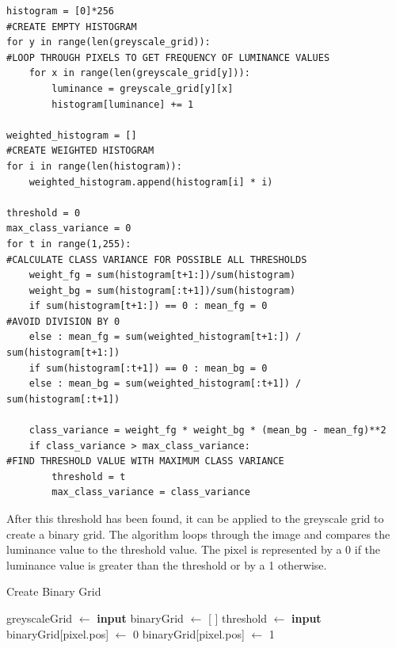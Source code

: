 \documentclass[titlepage]{article}
\begin{document}
\begin{changemargin}{-1in}{-1in} 
\begin{verbatim}
histogram = [0]*256                                                             #CREATE EMPTY HISTOGRAM
for y in range(len(greyscale_grid)):                                            #LOOP THROUGH PIXELS TO GET FREQUENCY OF LUMINANCE VALUES
    for x in range(len(greyscale_grid[y])):
        luminance = greyscale_grid[y][x]
        histogram[luminance] += 1

weighted_histogram = []                                                         #CREATE WEIGHTED HISTOGRAM
for i in range(len(histogram)):
    weighted_histogram.append(histogram[i] * i)

threshold = 0
max_class_variance = 0
for t in range(1,255):                                                          #CALCULATE CLASS VARIANCE FOR POSSIBLE ALL THRESHOLDS
    weight_fg = sum(histogram[t+1:])/sum(histogram)
    weight_bg = sum(histogram[:t+1])/sum(histogram)
    if sum(histogram[t+1:]) == 0 : mean_fg = 0                                  #AVOID DIVISION BY 0                             
    else : mean_fg = sum(weighted_histogram[t+1:]) / sum(histogram[t+1:])
    if sum(histogram[:t+1]) == 0 : mean_bg = 0                            
    else : mean_bg = sum(weighted_histogram[:t+1]) / sum(histogram[:t+1])

    class_variance = weight_fg * weight_bg * (mean_bg - mean_fg)**2
    if class_variance > max_class_variance:                                     #FIND THRESHOLD VALUE WITH MAXIMUM CLASS VARIANCE
        threshold = t
        max_class_variance = class_variance
\end{verbatim}
\end{changemargin} 

After this threshold has been found, it can be applied to the greyscale grid to create a binary grid. The algorithm loops through the image and compares the luminance value to the threshold value. The pixel is represented by a 0 if the luminance value is greater than the threshold or by a 1 otherwise.

\begin{algorithm}[H]
\caption{Create Binary Grid}
\begin{algorithmic}[1]
	\State greyscaleGrid $\gets$ \textbf{input}
	\State binaryGrid $\gets$ [ ]
	\State threshold $\gets$ \textbf{input}
            		\State binaryGrid[pixel.pos] $\gets$ 0
            	 \Else
             		\State binaryGrid[pixel.pos] $\gets$ 1
           	\EndIf
        \EndFor
\end{algorithmic}
\end{algorithm}
\end{document}
